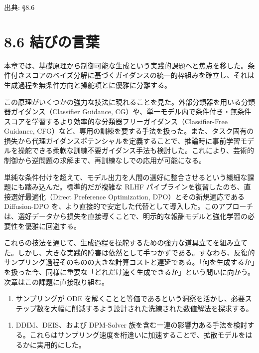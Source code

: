 

{\color{gray}\footnotesize 出典: §8.6\par}
\vspace{0.2em}

\section*{8.6 結びの言葉}


本章では、基礎原理から制御可能な生成という実践的課題へと焦点を移した。条件付きスコアのベイズ分解に基づくガイダンスの統一的枠組みを確立し、それは生成過程を無条件方向と操舵項とに優雅に分離する。

この原理がいくつかの強力な技法に現れることを見た。外部分類器を用いる分類器ガイダンス（Classifier Guidance, CG）や、単一モデル内で条件付き・無条件スコアを学習するより効率的な分類器フリーガイダンス（Classifier-Free Guidance, CFG）など、専用の訓練を要する手法を扱った。また、タスク固有の損失から代理ガイダンスポテンシャルを定義することで、推論時に事前学習モデルを操舵できる柔軟な訓練不要ガイダンス手法も検討した。これにより、芸術的制御から逆問題の求解まで、再訓練なしでの応用が可能になる。

単純な条件付けを超えて、モデル出力を人間の選好に整合させるという繊細な課題にも踏み込んだ。標準的だが複雑な RLHF パイプラインを復習したのち、直接選好最適化（Direct Preference Optimization, DPO）とその新規適応である Diffusion-DPO を、より直接的で安定した代替として導入した。このアプローチは、選好データから損失を直接導くことで、明示的な報酬モデルと強化学習の必要性を優雅に回避する。

これらの技法を通じて、生成過程を操舵するための強力な道具立てを組み立てた。しかし、大きな実践的障害は依然として手つかずである。すなわち、反復的サンプリング過程そのものの大きな計算コストと遅延である。「何を生成するか」を扱った今、同様に重要な「どれだけ速く生成できるか」という問いに向かう。次章はこの課題に直接取り組む。

\begin{enumerate}
\item サンプリングが ODE を解くことと等価であるという洞察を活かし、必要ステップ数を大幅に削減するよう設計された洗練された数値解法を探求する。
\end{enumerate}


\begin{enumerate}
\item DDIM、DEIS、および DPM-Solver 族を含む一連の影響力ある手法を検討する。これらはサンプリング速度を桁違いに加速することで、拡散モデルをはるかに実用的にした。
\end{enumerate}


